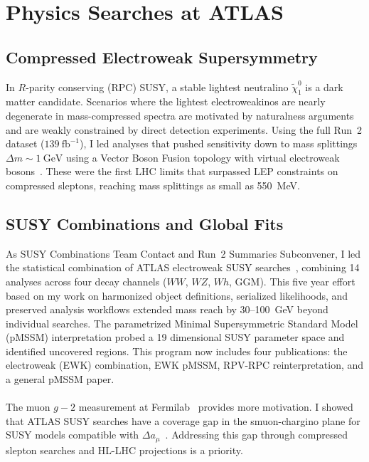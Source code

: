 \documentclass[10pt,a4paper,sans]{moderncv} %
\begin{document}
\section{Physics Searches at ATLAS}

\subsection{Compressed Electroweak Supersymmetry}
In $R$-parity conserving (RPC) SUSY, a stable lightest neutralino $\tilde{\chi}_1^0$ is a dark matter candidate. Scenarios where the lightest electroweakinos are nearly degenerate in mass-compressed spectra are motivated by naturalness arguments and are weakly constrained by direct detection experiments. Using the full Run~2 dataset ($139\ \mathrm{fb}^{-1}$), I led analyses that pushed sensitivity down to mass splittings $\Delta m \sim 1\ \mathrm{GeV}$ using a Vector Boson Fusion topology with virtual electroweak bosons~\cite{ATLAS:2019lng}. These were the first LHC limits that surpassed LEP constraints on compressed sleptons, reaching mass splittings as small as 550~MeV.

\subsection{SUSY Combinations and Global Fits}
As SUSY Combinations Team Contact and Run~2 Summaries Subconvener, I led the statistical combination of ATLAS electroweak SUSY searches~\cite{ATLAS:2024qxh}, combining 14 analyses across four decay channels ($WW$, $WZ$, $Wh$, GGM). This five year effort based on my work on harmonized object definitions, serialized likelihoods, and preserved analysis workflows extended mass reach by 30--100~GeV beyond individual searches. The parametrized Minimal Supersymmetric Standard Model (pMSSM) interpretation probed a 19 dimensional SUSY parameter space and identified uncovered regions. This program now includes four publications: the electroweak (EWK) combination, EWK pMSSM, RPV-RPC reinterpretation, and a general pMSSM paper.
\\
\\
The muon $g-2$ measurement at Fermilab~\cite{PhysRevLett.126.141801} provides more motivation. I showed that ATLAS SUSY searches have a coverage gap in the smuon-chargino plane for SUSY models compatible with $\Delta a_\mu$~\cite{Chakraborti:2021dli}. Addressing this gap through compressed slepton searches and HL-LHC projections is a priority.
\end{document}
